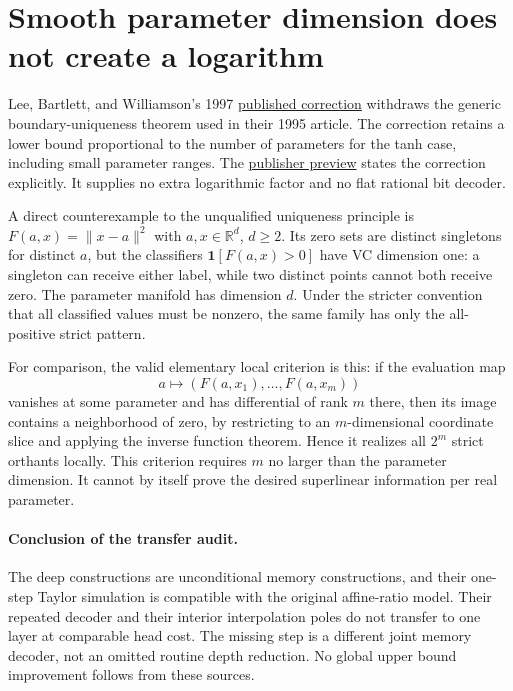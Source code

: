 \documentclass[11pt]{article}
\begin{document}
\section{Smooth parameter dimension does not create a logarithm}

Lee, Bartlett, and Williamson's 1997
\href{https://doi.org/10.1162/neco.1997.9.4.765}{published correction}
withdraws the generic boundary-uniqueness theorem used in their 1995
article. The correction retains a lower bound proportional to the
number of parameters for the tanh case, including small parameter
ranges. The
\href{https://www.researchgate.net/publication/242919186_Correction_to_Lower_Bounds_on_VC-Dimension_of_Smoothly_Parameterized_Function_Classes}{publisher preview}
states the correction explicitly. It supplies no extra logarithmic
factor and no flat rational bit decoder.

A direct counterexample to the unqualified uniqueness principle is
$F(a,x)=\|x-a\|^2$ with $a,x\in\mathbb R^d$, $d\ge2$. Its zero
sets are distinct singletons for distinct $a$, but the classifiers
$\mathbf1[F(a,x)>0]$ have VC dimension one: a singleton can receive
either label, while two distinct points cannot both receive zero.
The parameter manifold has dimension $d$. Under the stricter
convention that all classified values must be nonzero, the same
family has only the all-positive strict pattern.

For comparison, the valid elementary local criterion is this:
if the evaluation map
\[
 a\longmapsto(F(a,x_1),\ldots,F(a,x_m))
\]
vanishes at some parameter and has differential of rank $m$ there,
then its image contains a neighborhood of zero, by restricting to
an $m$-dimensional coordinate slice and applying the inverse
function theorem. Hence it realizes all $2^m$ strict orthants
locally. This criterion requires $m$ no larger than the parameter
dimension. It cannot by itself prove the desired superlinear
information per real parameter.

\paragraph{Conclusion of the transfer audit.}
The deep constructions are unconditional memory constructions,
and their one-step Taylor simulation is compatible with the
original affine-ratio model. Their repeated decoder and their
interior interpolation poles do not transfer to one layer at
comparable head cost. The missing step is a different joint memory
decoder, not an omitted routine depth reduction. No global upper
bound improvement follows from these sources.
\end{document}
